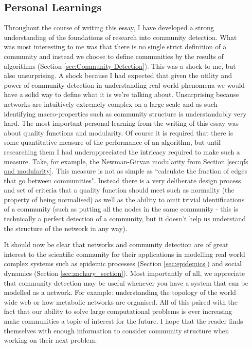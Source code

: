 \subsection{Personal Learnings}
Throughout the course of writing this essay, I have developed a strong understanding of the foundations of research into community detection. What was most interesting to me was that there is no single strict definition of a community and instead we choose to define communities by the results of algorithms (Section \ref{sec:Community Detection}). This was a shock to me, but also unsurprising. A shock because I had expected that given the utility and power of community detection in understanding real world phenomena we would have a solid way to define what it is we're talking about. Unsurprising because networks are intuitively extremely complex on a large scale and as such identifying macro-properties such as community structure is understandably very hard. The most important personal learning from the writing of this essay was about quality functions and modularity. Of course it is required that there is some quantitative measure of the performance of an algorithm, but until researching them I had underappreciated the intricacy required to make such a measure. Take, for example, the Newman-Girvan modularity from Section \ref{sec:qfs and modularity}. This measure is not as simple as ``calculate the fraction of edges that go between communities". Instead there is a very deliberate design process and set of criteria that a quality function should meet such as normality (the property of being normalised) as well as the ability to omit trivial identifications of a community (such as putting all the nodes in the same community - this is technically a perfect detection of a community, but it doesn't help us understand the structure of the network in any way).

It should now be clear that networks and community detection are of great interest to the scientific community for their applications in modelling real world complex systems such as epidemic processes (Section \ref{sec:epidemics}) and social dynamics (Section \ref{sec:zachary_section}). Most importantly of all, we appreciate that community detection may be useful whenever you have a system that can be modelled as a network. For example: understanding the topology of the world wide web\cite{BARABASI200069} or how metabolic networks are organised\cite{Jeong2000}. All of this paired with the fact that our ability to solve large computational problems is ever increasing make communities a topic of interest for the future. I hope that the reader finds themselves with enough information to consider community structure when working on their next problem.

